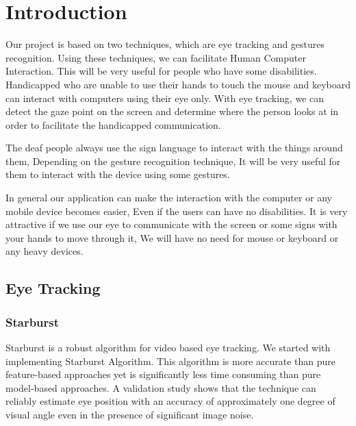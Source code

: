 \chapter{Introduction}
Our project is based on two techniques, which are eye tracking and gestures recognition. Using these techniques, we can facilitate Human Computer Interaction. This will be very useful for people who have some disabilities. Handicapped who are unable to use their hands to touch the mouse and keyboard can interact with computers using their eye only. With eye tracking, we can detect the gaze point on the screen and determine where the person looks at in order to facilitate the handicapped communication.

The deaf people always use the sign language to interact with the things around them, Depending on the gesture recognition technique, It will be very useful for them to interact with the device using some gestures.

In general our application can make the interaction with the computer or any mobile device becomes easier, Even if the users can have no disabilities. It is very attractive if we use our eye to communicate with the screen or some signs with your hands to move through it, We will have no need for mouse or keyboard or any heavy devices.

\section{Eye Tracking}
\subsection{Starburst}
Starburst is a robust algorithm for video based eye tracking. We started with implementing Starburst Algorithm. This algorithm is more accurate than pure feature-based approaches yet is significantly less time consuming than pure model-based approaches. A validation study shows that the technique can reliably estimate eye position with an accuracy of approximately one degree of visual angle even in the presence of significant image noise. \bigskip

